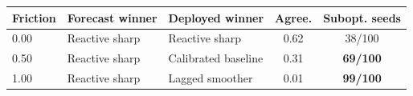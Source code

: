 \begin{tabularx}{\columnwidth}{@{}lXXcc@{}}
\toprule
Friction & Forecast winner & Deployed winner & Agree. & Subopt. seeds \\
\midrule
0.00 & Reactive sharp & Reactive sharp & 0.62 & 38/100 \\
0.50 & Reactive sharp & Calibrated baseline & 0.31 & \textbf{69/100} \\
1.00 & Reactive sharp & Lagged smoother & 0.01 & \textbf{99/100} \\
\bottomrule
\end{tabularx}
